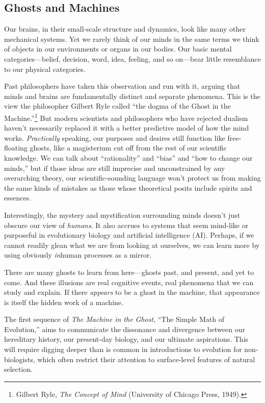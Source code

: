 \subsection{Ghosts and Machines}

{
 Our brains, in their small-scale structure and dynamics, look like
many other mechanical systems. Yet we rarely think of our minds in the
same terms we think of objects in our environments or organs in our
bodies. Our basic mental categories---belief, decision, word, idea,
feeling, and so on---bear little resemblance to our physical
categories.}

{
 Past philosophers have taken this observation and run with it,
arguing that minds and brains are fundamentally distinct and separate
phenomena. This is the view the philosopher Gilbert Ryle called
``the dogma of the Ghost in the
Machine.''\footnote{Gilbert Ryle, \textit{The Concept of Mind} (University of
Chicago Press, 1949).} But modern scientists
and philosophers who have rejected dualism haven't
necessarily replaced it with a better predictive model of how the mind
works. \textit{Practically} speaking, our purposes and desires still
function like free-floating ghosts, like a magisterium cut off from the
rest of our scientific knowledge. We can talk about
``rationality'' and
``bias'' and ``how
to change our minds,'' but if those ideas are still
imprecise and unconstrained by any overarching theory, our
scientific-sounding language won't protect us from
making the same kinds of mistakes as those whose theoretical posits
include spirits and essences.}

{
 Interestingly, the mystery and mystification surrounding minds
doesn't just obscure our view of \textit{humans}. It
also accrues to systems that seem mind-like or purposeful in
evolutionary biology and artificial intelligence (AI). Perhaps, if we
cannot readily glean what we are from looking at ourselves, we can
learn more by using obviously \textit{in}human processes as a mirror.}

{
 There are many ghosts to learn from here---ghosts past, and
present, and yet to come. And these illusions are real cognitive
events, real phenomena that we can study and explain. If there
\textit{appears} to be a ghost in the machine, that appearance is
itself the hidden work of a machine.}

{
 The first sequence of \textit{The Machine in the Ghost},
``The Simple Math of Evolution,''
aims to communicate the dissonance and divergence between our
hereditary history, our present-day biology, and our ultimate
aspirations. This will require digging deeper than is common in
introductions to evolution for non-biologists, which often restrict
their attention to surface-level features of natural selection.}

